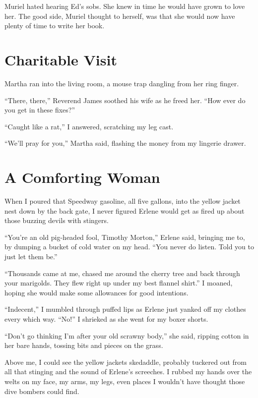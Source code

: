 \documentclass[twoside,10pt]{book}
\begin{document}
Muriel hated hearing Ed's sobs. She knew in time he would have grown to
love her. The good side, Muriel thought to herself, was that she would
now have plenty of time to write her book.



\cleardoublepage
\chapter{Charitable Visit}

Martha ran into the living room, a mouse trap dangling from her ring
finger.

``There, there,'' Reverend James soothed his wife as he freed her. ``How
ever do you get in these fixes?''

``Caught like a rat,'' I answered, scratching my leg cast.

``We'll pray for you,'' Martha said, flashing the money from my lingerie
drawer.



\cleardoublepage
\chapter{A Comforting Woman}

When I poured that Speedway gasoline, all five gallons, into the yellow
jacket nest down by the back gate, I never figured Erlene would get as
fired up about those buzzing devils with stingers.

``You're an old pig-headed fool, Timothy Morton,'' Erlene said, bringing
me to, by dumping a bucket of cold water on my head. ``You never do
listen. Told you to just let them be.''

``Thousands came at me, chased me around the cherry tree and back
through your marigolds. They flew right up under my best flannel
shirt.'' I moaned, hoping she would make some allowances for good
intentions.

``Indecent,'' I mumbled through puffed lips as Erlene just yanked off my
clothes every which way. ``No!'' I shrieked as she went for my boxer
shorts.

``Don't go thinking I'm after your old scrawny body,'' she said, ripping
cotton in her bare hands, tossing bits and pieces on the grass.

Above me, I could see the yellow jackets skedaddle, probably tuckered
out from all that sting­ing and the sound of Erlene's screeches. I
rubbed my hands over the welts on my face, my arms, my legs, even places
I wouldn't have thought those dive bombers could find.
\end{document}
